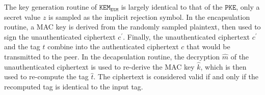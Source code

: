 \documentclass[journal=tches,submission]{iacrtrans}
\newcommand{\pke}{\texttt{PKE}}
\newcommand{\kem}{\texttt{KEM}}
\newcommand{\etm}{\texttt{EtM}}  %
\begin{document}
The key generation routine of $\kem_\etm$ is largely identical to that of the $\pke$, only a secret value $z$ is sampled as the implicit rejection symbol. In the encapsulation routine, a MAC key is derived from the randomly sampled plaintext, then used to sign the unauthenticated ciphertext $c^\prime$. Finally, the unauthenticated ciphertext $c^\prime$ and the tag $t$ combine into the authenticated ciphertext $c$ that would be transmitted to the peer. In the decapsulation routine, the decryption $\hat{m}$ of the unauthenticated ciphertext is used to re-derive the MAC key $\hat{k}$, which is then used to re-compute the tag $\hat{t}$. The ciphertext is considered valid if and only if the recomputed tag is identical to the input tag.

\end{document}
